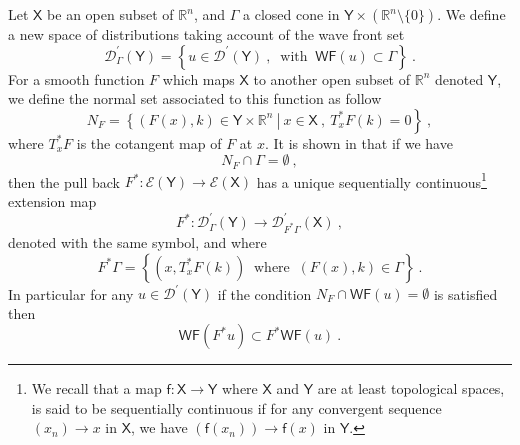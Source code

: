 \documentclass[11pt]{book}
\newcommand{\WF}{\mathsf{WF}}
\newcommand{\Dcal}{\mathcal{D}}
\newcommand{\Ecal}{\mathcal{E}}
\newcommand{\Rbb}{\mathbb{R}}
\newcommand{\Xsf}{\mathsf{X}}
\newcommand{\Ysf}{\mathsf{Y}}
\newcommand{\fsf}{\mathsf{f}}
\theoremstyle{break}
\begin{document}
Let $\Xsf$ be an open subset of $\Rbb^n$, and $\Gamma$ a closed cone in $\Ysf \times\left(\Rbb^n\setminus\{0\}\right)$. We define a new space of distributions taking account of the wave front set
%
\begin{equation*}
\Dcal^\prime_\Gamma(\Ysf) = \left\{ u \in \Dcal^\prime(\Ysf) \ , \ \mbox{ with } \ \WF(u) \subset \Gamma \right\} \ . 
\end{equation*}
%
For a smooth function $F$ which maps $\Xsf$ to another open subset of $\Rbb^n$ denoted $\Ysf$, we define the normal set associated to this function as follow
%
\begin{equation*}
N_F = \left. \left\{ (F(x),k) \in \Ysf \times \Rbb^n \ \right| \ x \in \Xsf \ , \ T^\ast_xF(k) = 0 \right\} \ , 
\end{equation*}
%
where $T^\ast_xF$ is the cotangent map of $F$ at $x$. It is shown in \cite[theorem 8.2.4]{hormander_analysis_1990} that if we have
%
\begin{equation}
N_F \cap \Gamma = \emptyset \ , 
\label{eq:cond_pullback_wf}
\end{equation}
%
then the pull back $F^\ast : \Ecal(\Ysf) \to \Ecal(\Xsf)$ has a unique sequentially continuous\footnote{We recall that a map $\fsf : \Xsf \to \Ysf$ where $\Xsf$ and $\Ysf$ are at least topological spaces, is said to be sequentially continuous if for any convergent sequence $(x_n) \to x$ in $\Xsf$, we have $(\fsf(x_n)) \to \fsf(x)$ in $\Ysf$.} extension map 
%
\begin{equation*}
F^\ast : \Dcal^\prime_\Gamma(\Ysf) \to \Dcal^\prime_{F^\ast\Gamma}(\Xsf) \ , 
\end{equation*}
%
denoted with the same symbol, and where
%
\begin{equation*}
F^\ast\Gamma = \left\{ \left(x , T^\ast_xF(k)\right) \ \mbox{ where } \ (F(x),k) \in \Gamma \right\} \ .
\end{equation*}
%
In particular for any $u \in \Dcal^\prime(\Ysf)$ if the condition $N_F \cap \WF(u) = \emptyset$ is satisfied then
%
\begin{equation*}
\WF(F^\ast u) \subset F^\ast \WF(u) \ .
\end{equation*}
\end{document}
